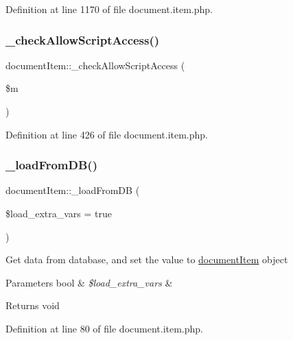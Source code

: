 Definition at line 1170 of file document.\+item.\+php.

\hypertarget{classdocumentItem_a0d88d945333c887802ad1f8442f5d5c7}{}\label{classdocumentItem_a0d88d945333c887802ad1f8442f5d5c7} 
\subsubsection{\texorpdfstring{\+\_\+check\+Allow\+Script\+Access()}{\_checkAllowScriptAccess()}}
{\footnotesize\ttfamily document\+Item\+::\+\_\+check\+Allow\+Script\+Access (\begin{DoxyParamCaption}\item[{}]{\$m }\end{DoxyParamCaption})}



Definition at line 426 of file document.\+item.\+php.

\hypertarget{classdocumentItem_a277e26ba6e0abb42dab5cccbdf48e450}{}\label{classdocumentItem_a277e26ba6e0abb42dab5cccbdf48e450} 
\subsubsection{\texorpdfstring{\+\_\+load\+From\+D\+B()}{\_loadFromDB()}}
{\footnotesize\ttfamily document\+Item\+::\+\_\+load\+From\+DB (\begin{DoxyParamCaption}\item[{}]{\$load\+\_\+extra\+\_\+vars = {\ttfamily true} }\end{DoxyParamCaption})}

Get data from database, and set the value to \hyperlink{classdocumentItem}{document\+Item} object 
\begin{DoxyParams}[1]{Parameters}
bool & {\em \$load\+\_\+extra\+\_\+vars} & \\
\hline
\end{DoxyParams}
\begin{DoxyReturn}{Returns}
void 
\end{DoxyReturn}


Definition at line 80 of file document.\+item.\+php.

\hypertarget{classdocumentItem_af32d9aba9797f3a913ac66031304ee92}{}\label{classdocumentItem_af32d9aba9797f3a913ac66031304ee92} 
